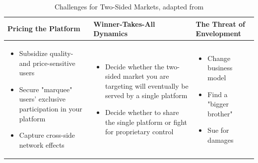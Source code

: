 \begin{table}[t]
	\caption[Challenges for Two-Sided Markets]{Challenges for Two-Sided Markets, adapted from \citet{Eisenmann2006}}
	\label{tab:stsm}
	\centering
	\begin{tabular}{L{.3\textwidth}L{.3\textwidth}L{.3\textwidth}}
			\toprule 
			\footnotesize \textbf{Pricing the Platform} &
			\footnotesize \textbf{Winner-Takes-All Dynamics} &
			\footnotesize \textbf{The Threat of Envelopment} \\ \midrule
			\vspace{-4mm}
			\footnotesize
			\begin{itemize}[leftmargin=*, parsep=0pt, topsep=0pt, itemsep=0pt]
				\item Subsidize quality- and price-sensitive users
				\item Secure "marquee" users' exclusive participation in your platform
				\item Capture cross-side network effects \vspace{-\baselineskip} 
			\end{itemize} &
			\vspace{-4mm}
			\footnotesize
			\begin{itemize}[leftmargin=*, parsep=0pt, topsep=0pt, itemsep=0pt]
				\item Decide whether the two-sided market you are targeting will eventually be served by a single platform
				\item Decide whether to share the single platform or fight for proprietary control \vspace{-\baselineskip} 
			\end{itemize}	&
			\vspace{-4mm}
			\footnotesize
			\begin{itemize}[leftmargin=*, parsep=0pt, topsep=0pt, itemsep=0pt]
				\item Change business model
				\item Find a "bigger brother"
				\item Sue for damages \vspace{-\baselineskip} 
			\end{itemize}\\ \bottomrule
	\end{tabular}
\end{table}

